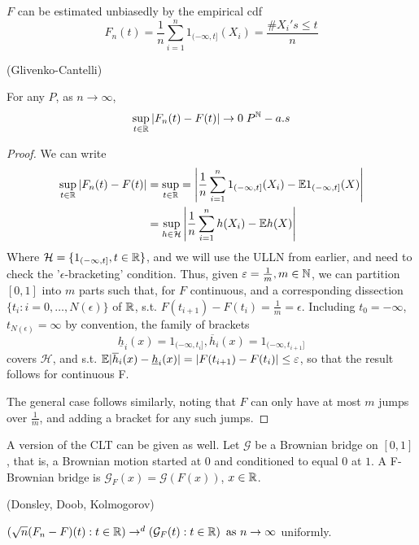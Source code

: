 \documentclass[a4paper]{article}
\begin{document}
$F$ can be estimated unbiasedly by the empirical cdf
\[
	F_n(t) = \frac{1}{n} \sum_{i=1}^{n} 1_{(-\infty, t]}(X_i) = \frac{\#X_i's \le t}{n}
\]

\begin{thm} (Glivenko-Cantelli)
	
	For any $P$, as $n\to \infty$,
	\[
		\sup_{t \in \mathbb{R}} |F_n(t) - F(t)| \to 0 \; P^{\mathbb{N}}-a.s
	\] 
\end{thm}

\begin{proof}
	We can write 
	\begin{align*}
		\sup_{t \in \mathbb{R}} |F_n(t) - F(t)| &= \sup_{t \in \mathbb{R}} = \left| \frac{1}{n} \sum_{i=1}^{n}1_{(-\infty,t]} (X_i) - \mathbb{E} 1_{(-\infty,t]}(X) \right| \\
		&= \sup_{h\in \mathcal{H}} \left| \frac{1}{n} \sum_{i=1}^{n} h(X_i) - \mathbb{E} h(X) \right|
	\end{align*}
	Where $\mathcal{H} = \{1_{(-\infty,t]}, t\in \mathbb{R}\} $, and we will use the ULLN from earlier, and need to check the '$\epsilon$-bracketing' condition. Thus, given  $\varepsilon = \frac{1}{m}, m \in \mathbb{N}$, we can partition $[0,1]$ into $m$ parts such that, for $F$ continuous, and a corresponding dissection $\{t_i : i=0,\ldots,N(\epsilon)\} $ of $\mathbb{R}$, s.t.  $F(t_{i+1}) - F(t_i) = \frac{1}{m} = \epsilon$. Including $t_0 = -\infty$, $t_{N(\epsilon)} = \infty$ by convention, the family of brackets
\[
	\underline{h}_i(x) = 1_{(-\infty, t_{i}]}, \overline{h}_i(x) = 1_{(-\infty, t_{i+1}]}
\] 
covers $\mathcal{H}$, and s.t. $\mathbb{E} |\overline{h}_i(x) - \underline{h}_i(x)| = |F(t_{i+1}) - F(t_i)| \le \varepsilon$, so that the result follows for continuous F.

The general case follows similarly, noting that $F$ can only have at most $m$ jumps over $\frac{1}{m}$, and adding a bracket for any such jumps.
\end{proof}

A version of the CLT can be given as well. Let  $\mathcal{G}$ be a Brownian bridge on $[0,1]$, that is, a Brownian motion started at 0 and conditioned to equal  $0$ at $1$. A F-Brownian bridge is $\mathcal{G}_{F}(x) = \mathcal{G}(F(x)) $, $x\in \mathbb{R}$.

\begin{thm} (Donsley, Doob, Kolmogorov)
        
        $\left( \sqrt{n} (F_n - F)(t): t \in \mathbb{R} \right) \to ^{d} \left( \mathcal{G}_F(t) : t \in \mathbb{R} \right) \text{ as } n\to \infty$ uniformly.
\end{thm}
\end{document}
